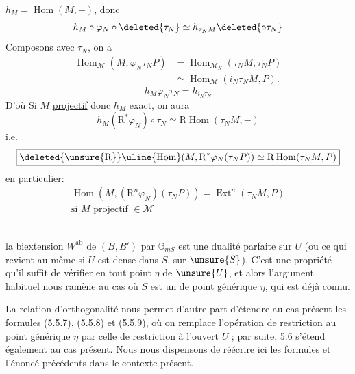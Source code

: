 \uline{\hspace{15em}}
\(h_M=\operatorname{Hom}(M,-)\), donc
\[
h_M\circ\varphi_N\circ\deleted{\tau_N}\simeq
 h_{\tau_NM}\deleted{\circ\tau_N}
\]
Composons avec \(\tau_N\), on a
\[
\begin{aligned}
\operatorname{Hom}_{\mathcal M}(M,\varphi_N\tau_NP)
 &=\operatorname{Hom}_{\mathcal M_N}(\tau_NM,\tau_NP)\\
 &\simeq\operatorname{Hom}_{\mathcal M}(i_N\tau_NM,P).
\end{aligned}
\]
\[h_M\varphi_N\tau_N=h_{i_N\tau_N}\]
D'où
Si \(M\) \uline{projectif} donc \(h_M\) exact, on aura
\[
h_M(\mathrm R^*\varphi_N)\circ\tau_N\simeq
 \mathrm R\operatorname{Hom}(\tau_NM,-)
\]
i.e.
\[
\boxed{\deleted{\unsure{\mathrm R}}\uline{\operatorname{Hom}}(M,\mathrm R^*\varphi_N(\tau_NP))
 \simeq\mathrm R\operatorname{Hom}(\tau_NM,P)}
\]
en particulier:
\[
\boxed{\begin{gathered}
\operatorname{Hom}(M,(\mathrm R^n\varphi_N)(\tau_NP))
 =\operatorname{Ext}^n(\tau_NM,P)\\
\text{si }M\text{ projectif }\in\mathcal M
\end{gathered}}
\]
-  - 

la biextension \(W^{\mathrm{ab}}\) de \((B,B')\) par \(\mathbb G_{mS}\) est une
dualité parfaite sur \(U\) (ou ce qui revient au même si \(U\) est dense dans
\(S\), sur \(\unsure{S}\)). C'est une propriété qu'il suffit de vérifier en tout
point \(\eta\) de \(\unsure{U}\), et alors l'argument habituel nous ramène au cas où
\(S\) est un  de point générique \(\eta\), qui est déjà connu.

La relation d'orthogonalité nous permet d'autre part d'étendre au cas présent
les formules (5.5.7), (5.5.8) et (5.5.9), où on remplace l'opération de restriction
au point générique \(\eta\) par celle de restriction à l'ouvert \(U\) ; par suite,
5.6 s'étend également au cas présent. Nous nous dispensons de réécrire ici les
formules et l'énoncé précédents dans le contexte présent.

